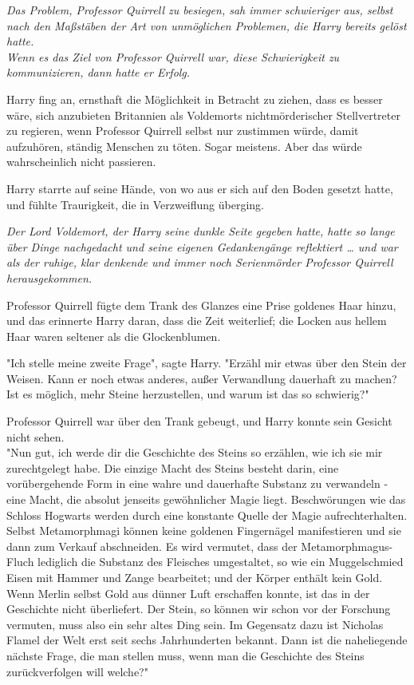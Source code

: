 {\emph{Das Problem, Professor Quirrell zu besiegen, sah immer schwieriger aus, selbst nach den Maßstäben der Art von unmöglichen Problemen, die Harry bereits gelöst hatte.\\ Wenn es das Ziel von Professor Quirrell war, diese Schwierigkeit zu kommunizieren, dann hatte er Erfolg.}

Harry fing an, ernsthaft die Möglichkeit in Betracht zu ziehen, dass es besser wäre, sich anzubieten Britannien als Voldemorts nichtmörderischer Stellvertreter zu regieren, wenn Professor Quirrell selbst nur zustimmen würde, damit aufzuhören, ständig Menschen zu töten. Sogar meistens. Aber das würde wahrscheinlich nicht passieren.

Harry starrte auf seine Hände, von wo aus er sich auf den Boden gesetzt hatte, und fühlte Traurigkeit, die in Verzweiflung überging.

\emph{Der Lord Voldemort, der Harry seine dunkle Seite gegeben hatte, hatte so lange über Dinge nachgedacht und seine eigenen Gedankengänge reflektiert … und war als der ruhige, klar denkende und immer noch Serienmörder Professor Quirrell herausgekommen.}

Professor Quirrell fügte dem Trank des Glanzes eine Prise goldenes Haar hinzu, und das erinnerte Harry daran, dass die Zeit weiterlief; die Locken aus hellem Haar waren seltener als die Glockenblumen.

"Ich stelle meine zweite Frage", sagte Harry. "Erzähl mir etwas über den Stein der Weisen. Kann er noch etwas anderes, außer Verwandlung dauerhaft zu machen? Ist es möglich, mehr Steine herzustellen, und warum ist das so schwierig?"

Professor Quirrell war über den Trank gebeugt, und Harry konnte sein Gesicht nicht sehen.\\ "Nun gut, ich werde dir die Geschichte des Steins so erzählen, wie ich sie mir zurechtgelegt habe. Die einzige Macht des Steins besteht darin, eine vorübergehende Form in eine wahre und dauerhafte Substanz zu verwandeln - eine Macht, die absolut jenseits gewöhnlicher Magie liegt. Beschwörungen wie das Schloss Hogwarts werden durch eine konstante Quelle der Magie aufrechterhalten. Selbst Metamorphmagi können keine goldenen Fingernägel manifestieren und sie dann zum Verkauf abschneiden. Es wird vermutet, dass der Metamorphmagus-Fluch lediglich die Substanz des Fleisches umgestaltet, so wie ein Muggelschmied Eisen mit Hammer und Zange bearbeitet; und der Körper enthält kein Gold. Wenn Merlin selbst Gold aus dünner Luft erschaffen konnte, ist das in der Geschichte nicht überliefert. Der Stein, so können wir schon vor der Forschung vermuten, muss also ein sehr altes Ding sein. Im Gegensatz dazu ist Nicholas Flamel der Welt erst seit sechs Jahrhunderten bekannt. Dann ist die naheliegende nächste Frage, die man stellen muss, wenn man die Geschichte des Steins zurückverfolgen will welche?"

}
